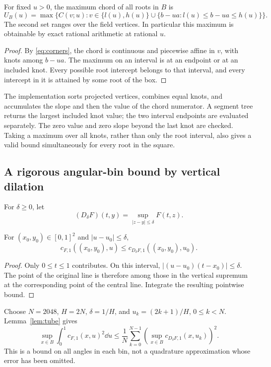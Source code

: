 \begin{proposition}\label{prop:envelope}
For fixed \(u>0\), the maximum chord of all roots in \(B\) is
\begin{equation}\label{eq:envelope}
 U_B(u)=\max\bigl\{C(v;u):
 v\in\{l(u),h(u)\}\cup
       \{b-ua:l(u)\le b-ua\le h(u)\}\bigr\}.
\end{equation}
The second set ranges over the field vertices. In particular this
maximum is obtainable by exact rational arithmetic at rational \(u\).
\end{proposition}
\begin{proof}
By \eqref{eq:corners}, the chord is continuous and piecewise affine
in \(v\), with knots among \(b-ua\). The maximum on an interval is
at an endpoint or at an included knot. Every possible root intercept
belongs to that interval, and every intercept in it is attained by
some root of the box.
\end{proof}

The implementation sorts projected vertices, combines equal knots,
and accumulates the slope and then the value of the chord numerator.
A segment tree returns the largest included knot value; the two
interval endpoints are evaluated separately. The zero value and zero
slope beyond the last knot are checked. Taking a maximum over all
knots, rather than only the root interval, also gives a valid bound
simultaneously for every root in the square.

\subsection{A rigorous angular-bin bound by vertical dilation}
For \(\delta\ge0\), let
\[
 (D_\delta F)(t,y)=\sup_{|z-y|\le\delta}F(t,z).
\]
\begin{lemma}\label{lem:tube}
For \((x_0,y_0)\in[0,1]^2\) and \(|u-u_0|\le\delta\),
\[
 c_{F,1}((x_0,y_0),u)
 \le c_{D_\delta F,1}((x_0,y_0),u_0).
\]
\end{lemma}
\begin{proof}
Only \(0\le t\le1\) contributes. On this interval,
\(|(u-u_0)(t-x_0)|\le\delta\). The point of the original line is
therefore among those in the vertical supremum at the corresponding
point of the central line. Integrate the resulting pointwise bound.
\end{proof}

Choose \(N=2048\), \(H=2N\), \(\delta=1/H\), and
\(u_k=(2k+1)/H\), \(0\le k<N\). Lemma~\ref{lem:tube} gives
\begin{equation}\label{eq:tube}
 \sup_{x\in B}\int_0^1 c_{F,1}(x,u)^2\dd u
 \le\frac1N\sum_{k=0}^{N-1}
       \left(\sup_{x\in B}c_{D_\delta F,1}(x,u_k)\right)^2.
\end{equation}
This is a bound on all angles in each bin, not a quadrature
approximation whose error has been omitted.

